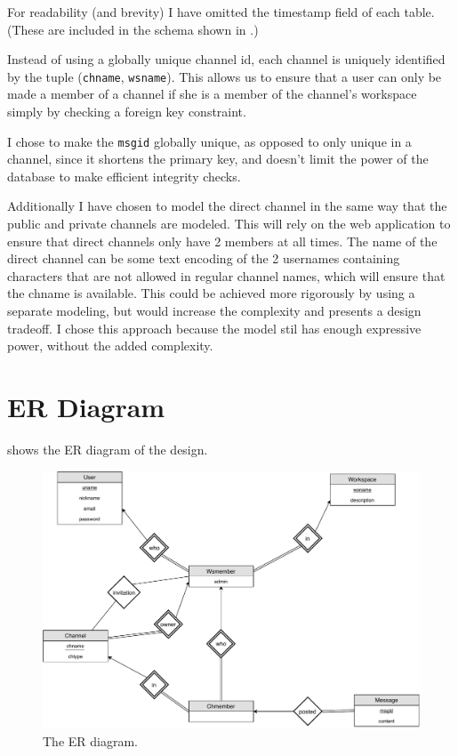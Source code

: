 \documentclass{article}
\newcommand{\ze}{she\xspace}
\begin{document}
For readability (and brevity) I have omitted the timestamp field of each table. (These are included in the schema shown in .)

Instead of using a globally unique channel id, each channel is uniquely identified by the tuple (\texttt{chname}, \texttt{wsname}). This allows us to ensure that a user can only be made a member of a channel if \ze is a member of the channel's workspace simply by checking a foreign key constraint.

I chose to make the \texttt{msgid} globally unique, as opposed to only unique in a channel, since it shortens the primary key, and doesn't limit the power of the database to make efficient integrity checks.

Additionally I have chosen to model the direct channel in the same way that the public and private channels are modeled. This will rely on the web application to ensure that direct channels only have 2 members at all times. The name of the direct channel can be some text encoding of the 2 usernames containing characters that are not allowed in regular channel names, which will ensure that the chname is available. This could be achieved more rigorously by using a separate modeling, but would increase the complexity and presents a design tradeoff. I chose this approach because the model stil has enough expressive power, without the added complexity.

\section{ER Diagram}

 shows the ER diagram of the design.

 \begin{figure}[!ht]
 	\centering
 	\includegraphics[width=0.9\linewidth]{dber}
 	\caption{The ER diagram.}
 	\label{fig:er}
\end{figure}
\end{document}
